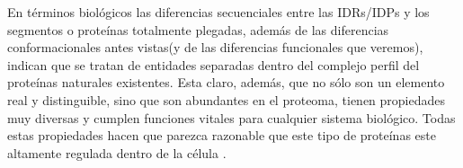 En términos biológicos las diferencias secuenciales entre las IDRs/IDPs y los segmentos o proteínas totalmente plegadas, además de las diferencias conformacionales antes vistas(y de las diferencias funcionales que veremos), 
indican que se tratan de entidades separadas dentro del complejo perfil del proteínas naturales existentes.
Esta claro, además, que no sólo son un elemento real y distinguible, sino que son abundantes en el proteoma, tienen propiedades muy diversas y cumplen funciones vitales para cualquier sistema biológico.
Todas estas propiedades hacen que parezca razonable que este tipo de proteínas este altamente regulada dentro de la célula \cite{gsponer2008tight,habchi2014introducing}.























































